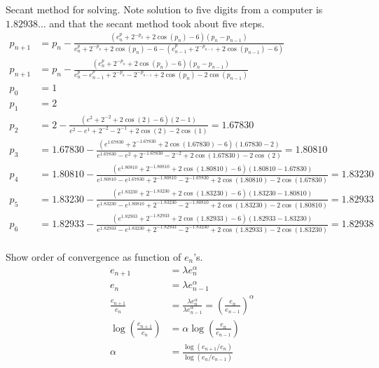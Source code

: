 \documentclass[newpage]{homework}
\begin{document}
\question
Secant method for solving. Note solution to five digits from a computer is $1.82938\dots$ and that the secant method took about five steps.
\begin{align*}
	p_{n+1}	&=	p_n - \frac{(e^p_n + 2^{-p_n} + 2\cos(p_n) - 6)(p_n - p_{n-1})}{e^p_n + 2^{-p_n} + 2\cos(p_n) - 6 - ( e^p_{n-1} + 2^{-p_{n-1}} + 2\cos(p_{n-1}) - 6)}	\\
	p_{n+1}	&=	p_n - \frac{(e^p_n + 2^{-p_n} + 2\cos(p_n) - 6)(p_n - p_{n-1})}{e^p_n - e^p_{n-1} + 2^{-p_n} -2^{-p_{n-1}} + 2\cos(p_n) - 2\cos(p_{n-1})}	\\
	p_0	&=	1	\\
	p_1	&=	2	\\
	p_2	&=	2 - \frac{(e^2 + 2^{-2} + 2\cos(2) - 6)(2 - 1)}{e^2 - e^1 + 2^{-2} -2^{-1} + 2\cos(2) - 2\cos(1)}	= 1.67830	\\
	p_3	&=	1.67830 - \frac{(e^{1.67830} + 2^{-1.67830} + 2\cos(1.67830) - 6)(1.67830 - 2)}{e^{1.67830} - e^2 + 2^{-1.67830} -2^{-2} + 2\cos(1.67830) - 2\cos(2)}	=	1.80810 \\
	p_4	&=	1.80810 - \frac{(e^{1.80810} + 2^{-1.80810} + 2\cos(1.80810) - 6)(1.80810 - 1.67830)}{e^{1.80810} - e^{1.67830} + 2^{-1.80810} -2^{-1.67830} + 2\cos(1.80810) - 2\cos(1.67830)}	=	1.83230 \\
	p_5	&=	1.83230 - \frac{(e^{1.83230} + 2^{-1.83230} + 2\cos(1.83230) - 6)(1.83230 - 1.80810)}{e^{1.83230} - e^{1.80810} + 2^{-1.83230} -2^{-1.80810} + 2\cos(1.83230) - 2\cos(1.80810)}	=	1.82933 \\
	p_6	&=	1.82933 - \frac{(e^{1.82933} + 2^{-1.82933} + 2\cos(1.82933) - 6)(1.82933 - 1.83230)}{e^{1.82933} - e^{1.83230} + 2^{-1.82933} -2^{-1.83230} + 2\cos(1.82933) - 2\cos(1.83230)}	=	\boxed{1.82938} \\
\end{align*}

\question
Show order of convergence as function of $e_n$'s.
\begin{align*}
	e_{n+1}	&=	\lambda e_n^\alpha	\\
	e_n	&=	\lambda e_{n-1}^\alpha	\\
	\frac{e_{n+1}}{e_n}	&=	\frac{\lambda e_n^\alpha}{\lambda e_{n-1}^\alpha} = \left(\frac{e_n}{e_{n-1}}\right)^\alpha	\\
	\log \left(\frac{e_{n+1}}{e_n}\right)	&=	\alpha \log \left(\frac{e_n}{e_{n-1}}\right)	\\
	\alpha	&=	\boxed{\frac{\log(e_{n+1}/e_n)}{\log(e_n/e_{n-1})}}
\end{align*}
\end{document}
